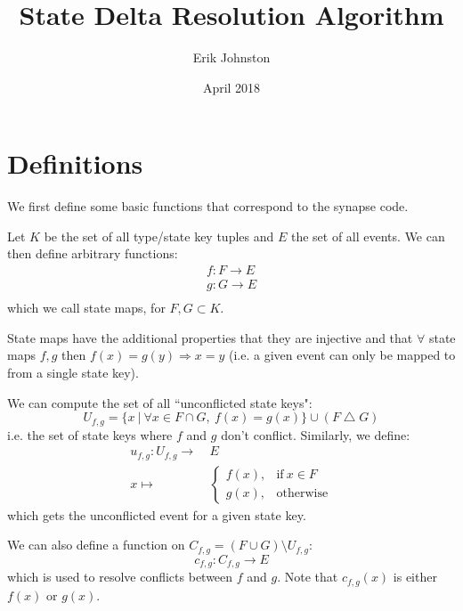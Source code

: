 \documentclass{article}
\title{State Delta Resolution Algorithm}
\author{Erik Johnston}
\date{April 2018}
\begin{document}
	
\maketitle

\section{Definitions}
	
We first define some basic functions that correspond to the synapse code.

Let $K$ be the set of all type/state key tuples and $E$ the set of all events. We can then define arbitrary functions:
\begin{equation}
\begin{split}
f: F \rightarrow E\\
g: G \rightarrow E\\
\end{split}
\end{equation} which we call state maps, for $F, G \subset K$.

State maps have the additional properties that they are injective and that $\forall$ state maps $f, g$ then $f(x) = g(y) \Rightarrow x = y$ (i.e. a given event can only be mapped to from a single state key).

We can compute the set of all ``unconflicted state keys":
\begin{equation}
U_{f,g} = \{x\ |\ \forall x \in F \cap G,\ f(x) = g(x)\} \cup (F \bigtriangleup G)
\end{equation} i.e. the set of state keys where $f$ and $g$ don't conflict. Similarly, we define:
\begin{equation}
\begin{split}
u_{f,g} : U_{f,g} \longrightarrow &\ E\\
x \longmapsto &\ \begin{cases}
	f(x), & \text{if}\ x \in F \\
	g(x), & \text{otherwise}
\end{cases}
\end{split}
\end{equation} which gets the unconflicted event for a given state key.


We can also define a function on $C_{f,g} = (F \cup G) \setminus U_{f,g}$:
\begin{equation}
c_{f,g}: C_{f,g} \rightarrow E
\end{equation} which is used to resolve conflicts between $f$ and $g$. Note that $c_{f,g}(x)$ is either $f(x)$ or $g(x)$.
\end{document}
